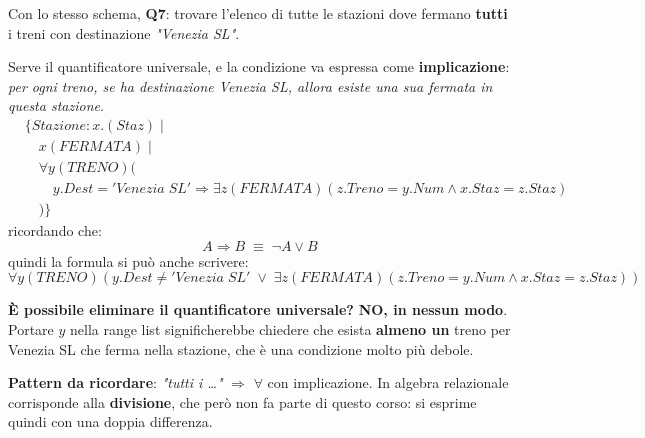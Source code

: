 \documentclass[a4paper,twoside]{article}
\begin{document}
\begin{example}
  Con lo stesso schema, \textbf{Q7}: trovare l'elenco di tutte le stazioni dove fermano
  \textbf{tutti} i treni con destinazione \textit{"Venezia SL"}.

  \vspace{1em}
  \noindent
  Serve il quantificatore universale, e la condizione va espressa come
  \textbf{implicazione}: \textit{per ogni treno, se ha destinazione Venezia SL, allora
  esiste una sua fermata in questa stazione}.
  \[
    \begin{aligned}
      &\{ Stazione: x.(Staz) \mid \\
      &\quad x(FERMATA) \mid \\
      &\quad \forall y(TRENO)(\\
      &\quad\quad y.Dest = 'Venezia\;SL' \Rightarrow
      \exists z(FERMATA)(z.Treno = y.Num \land x.Staz = z.Staz)\\
      &\quad )
      \}
    \end{aligned}
  \]
  ricordando che:
  \[
    A \Rightarrow B \;\equiv\; \lnot A \lor B
  \]
  quindi la formula si può anche scrivere:
  \[
    \forall y(TRENO)\left(
      y.Dest \neq 'Venezia\;SL' \;\lor\;
      \exists z(FERMATA)(z.Treno = y.Num \land x.Staz = z.Staz)
    \right)
  \]

  \vspace{1em}
  \noindent
  \textbf{È possibile eliminare il quantificatore universale?} \textbf{NO, in nessun
  modo}. Portare \( y \) nella range list significherebbe chiedere che esista
  \textbf{almeno un} treno per Venezia SL che ferma nella stazione, che è una condizione
  molto più debole.

  \vspace{1em}
  \noindent
  \textbf{Pattern da ricordare}: \textit{"tutti i \ldots"} \( \Rightarrow \)
  \( \forall \) con implicazione. In algebra relazionale corrisponde alla
  \textbf{divisione}, che però non fa parte di questo corso: si esprime quindi con una
  doppia differenza.
\end{example}
\end{document}
